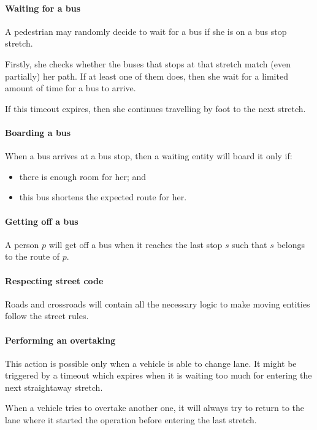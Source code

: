 \paragraph{Waiting for a bus} A pedestrian may randomly decide to wait for a
bus if she is on a bus stop stretch.

Firstly, she checks whether the buses that stops at that stretch match (even
partially) her path. If at least one of them does, then she wait for a limited
amount of time for a bus to arrive.

If this timeout expires, then she continues travelling by foot to the next
stretch.

\paragraph{Boarding a bus} When a bus arrives at a bus stop, then a waiting
entity will board it only if:

\begin{itemize}
  \item there is enough room for her; and
  \item this bus shortens the expected route for her.
\end{itemize}

\paragraph{Getting off a bus} A person $p$ will get off a bus when it reaches
the last stop $s$ such that $s$ belongs to the route of $p$.

\paragraph{Respecting street code} Roads and crossroads will contain all the
necessary logic to make moving entities follow the street rules.

\paragraph{Performing an overtaking} This action is possible only when a
vehicle is able to change lane. It might be triggered by a timeout which
expires when it is waiting too much for entering the next straightaway stretch.

When a vehicle tries to overtake another one, it will always try to return to
the lane where it started the operation before entering the last stretch.



